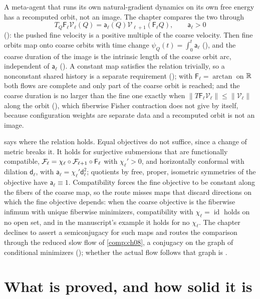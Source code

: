 A meta-agent that runs its own natural-gradient dynamics on its own free energy has a recomputed
orbit, not an image. The chapter compares the two through
\[
T_Q\mathsf F_\ell\mathscr V_\ell(Q)=\mathsf a_\ell(Q)\mathscr V_{\ell+1}(\mathsf F_\ell Q),
\qquad\mathsf a_\ell>0
\]
(): the pushed fine velocity is a positive multiple of the coarse
velocity. Then fine orbits map onto coarse orbits with time change $\psi_Q(t)=\int_0^t\mathsf a_\ell$
(), and the coarse duration of the image is the intrinsic length
of the coarse orbit arc, independent of $\mathsf a_\ell$ (). A constant
map satisfies the relation trivially, so a nonconstant shared history is a separate requirement
(); with $\mathsf F_\ell=\arctan$ on $\mathbb R$ both flows are complete and only
part of the coarse orbit is reached; and the coarse duration is no larger than the fine one exactly
when $\lVert T\mathsf F_\ell\mathscr V_\ell\rVert\leq\lVert\mathscr V_\ell\rVert$ along the orbit
(), which fiberwise Fisher contraction does not give by itself,
because configuration weights are separate data and a recomputed orbit is not an image.

 says where the relation holds. Equal objectives do not
suffice, since a change of metric breaks it. It holds for surjective submersions that are
functionally compatible, $\mathcal F_\ell=\chi_\ell\circ\mathcal F_{\ell+1}\circ\mathsf F_\ell$ with
$\chi_\ell'>0$, and horizontally conformal with dilation $\mathsf d_\ell$, with
$\mathsf a_\ell=\chi_\ell'\mathsf d_\ell^2$; quotients by free, proper, isometric symmetries of the
objective have $\mathsf a_\ell\equiv1$. Compatibility forces the fine objective to be constant along
the fibers of the coarse map, so the route misses maps that discard directions on which the fine
objective depends: when the coarse objective is the fiberwise infimum with unique fiberwise
minimizers, compatibility with $\chi_\ell=\operatorname{id}$ holds on no open set, and in the
manuscript's example it holds for no $\chi_\ell$. The chapter declines to assert a semiconjugacy for such maps and routes the comparison through
the reduced slow flow of \cref{comp:ch08}, a conjugacy on the graph of conditional minimizers
(); whether the actual flow follows that graph is
.

\section{What is proved, and how solid it is}
\label{comp:ch07-status}

